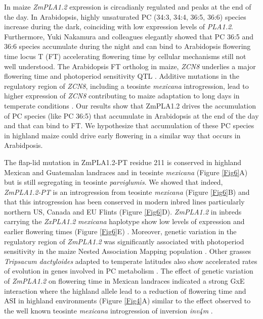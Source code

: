\documentclass[9pt,twocolumn,twoside,lineno]{BioRxiv}
\begin{document}
In maize \textit{ZmPLA1.2} expression is circadianly regulated\cite{Khan2010-iv} and peaks at the end of the day. 
In Arabidopsis, highly unsaturated PC (34:3, 34:4, 36:5, 36:6) species increase during the dark\cite{Maatta2012-ip}, coinciding with low expression levels of \textit{PLA1.2}\cite{Khan2010-iv}.
Furthermore, Yuki Nakamura and colleagues elegantly showed that PC 36:5 and 36:6 species accumulate during the night and can bind to Arabidopsis flowering time locus T (FT) accelerating flowering time \cite{Nakamura2014-qf} by cellular mechanisms still not well understood. 
The Arabidopsis FT ortholog in maize, \textit{ZCN8} \cite{Lazakis2011-nq} underlies a major flowering time and photoperiod sensitivity QTL \cite{Hung2012-ms}.
Additive mutations in the regulatory region of \textit{ZCN8}, including a teosinte \textit{mexicana} introgression, lead to higher expression of \textit{ZCN8} contributing to maize adaptation to long days in temperate conditions \cite{Guo2019-pn}.
Our results show that ZmPLA1.2 drives the accumulation of PC species (like PC 36:5) that accumulate in Arabidopsis at the end of the day and that can bind to FT. 
We hypothesize that accumulation of these PC species in highland maize could drive early flowering in a similar way that occurs in Arabidposis. 

The flap-lid mutation in ZmPLA1.2-PT residue 211 is conserved in highland Mexican and Guatemalan landraces and in teosinte \textit{mexicana} (Figure \ref{Fig6}A) but is still segregating in teosinte \textit{parviglumis}. 
We showed that indeed, \textit{ZmPLA1.2-PT} is an introgression from teosinte \textit{mexicana} (Figure \ref{Fig6}B) and that this introgression has been conserved in modern inbred lines particularly northern US, Canada and EU Flints (Figure \ref{Fig6}D). 
\textit{ZmPLA1.2} in inbreds carrying the \textit{ZxPLA1.2} \textit{mexicana} haplotype show low levels of expression and earlier flowering times (Figure \ref{Fig6}E) \cite{Kremling2018-gn}. 
Moreover, genetic variation in the regulatory region of \textit{ZmPLA1.2} was significantly associated with photoperiod sensitivity in the maize Nested Association Mapping population \cite{Hung2012-ms}. 
Other grasses \textit{Tripsacum dactyloides} adapted to temperate latitudes also show accelerated rates of evolution in genes involved in PC metabolism \cite{Yan2019-tx}.
The effect of genetic variation of \textit{ZmPLA1.2} on flowering time in Mexican landraces indicated a strong GxE interaction where the highland allele lead to a reduction of flowering time and ASI in highland environments (Figure \ref{Fig4}A) similar to the effect observed to the well known teosinte \textit{mexicana} introgression of inversion \textit{inv4m} \cite{Crow2020-gene}.
\end{document}

